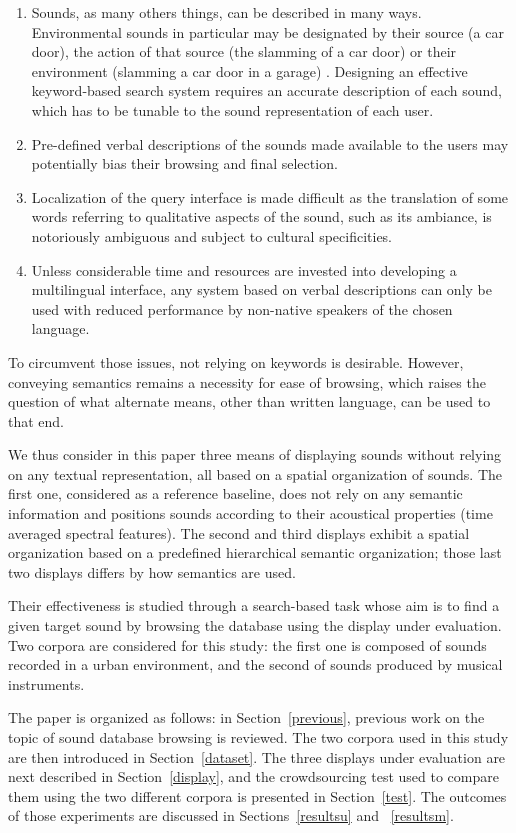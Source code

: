 \documentclass{aes2e}
\begin{document}
\begin{enumerate}
\item Sounds, as many others things, can be described in many ways. Environmental sounds in particular may be designated by their
source (a car door),  the action of that source (the slamming of a car door) or their environment (slamming a car door in a garage) \cite{houix2012lexical, niessen2010categories, brown2011towards}. Designing an effective keyword-based search system requires an accurate description of each sound, which has to be tunable to the sound representation of each user.
\item Pre-defined verbal descriptions of the sounds made available to the users may potentially bias their browsing and final selection.
\item Localization of the query interface is made difficult as the translation of some words referring to qualitative aspects of the sound, such as its ambiance, is notoriously ambiguous and subject to cultural specificities.
\item Unless considerable time and resources are invested into developing a multilingual interface, any system based on verbal descriptions can only be used with reduced performance by non-native speakers of the chosen language.
\end{enumerate}
To circumvent those issues, not relying on keywords is desirable. However, conveying semantics remains a necessity for ease of browsing, which raises the question of what alternate means, other than written language, can be used to that end.

We thus consider in this paper three means of displaying sounds without relying on any textual representation, all based on a spatial organization of sounds. The first one, considered as a reference baseline, does not rely on any semantic information and positions sounds according to their acoustical properties (time averaged spectral features). The second and third displays exhibit a spatial organization based  on a predefined hierarchical semantic organization; those last two displays differs by how semantics are used.

Their effectiveness is studied through a search-based task whose aim is to find a given target sound by browsing the database using the display under evaluation. Two corpora are considered for this study: the first one is composed of sounds recorded in a urban environment, and the second of sounds produced by musical instruments.

The paper is organized as follows: in Section~\ref{previous}, previous work on the topic of sound database browsing is reviewed. The two corpora used in this study are then introduced in Section~\ref{dataset}. The three displays under evaluation are next described in Section~\ref{display}, and the crowdsourcing test used to compare them using the two different corpora is presented in Section~\ref{test}. The outcomes of those experiments are discussed in Sections~\ref{resultsu} and ~\ref{resultsm}.
\end{document}
